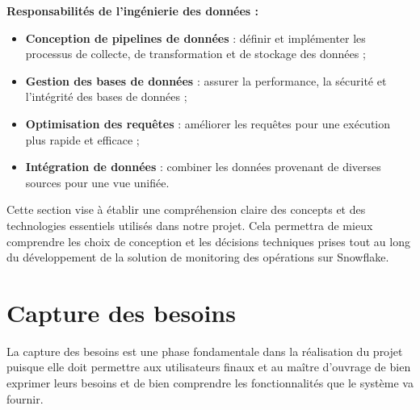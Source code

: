     \textbf{Responsabilités de l'ingénierie des données :}
    \begin{itemize}
        \item \textbf{Conception de pipelines de données} : définir et implémenter les processus de collecte, de transformation et de stockage des données ;
        \item \textbf{Gestion des bases de données} : assurer la performance, la sécurité et l'intégrité des bases de données ;
        \item \textbf{Optimisation des requêtes} : améliorer les requêtes pour une exécution plus rapide et efficace ;
        \item \textbf{Intégration de données} : combiner les données provenant de diverses sources pour une vue unifiée.
    \end{itemize}
    
    Cette section vise à établir une compréhension claire des concepts et des technologies essentiels utilisés dans notre projet. 
    Cela permettra de mieux comprendre les choix de conception et les décisions techniques prises tout au long du développement de 
    la solution de monitoring des opérations sur Snowflake.
    
\section{Capture des besoins}
\par La capture des besoins est une phase fondamentale dans la réalisation du projet puisque elle doit
permettre aux utilisateurs finaux et au maître d'ouvrage de bien exprimer leurs besoins et de bien
comprendre les fonctionnalités que le système va fournir.
